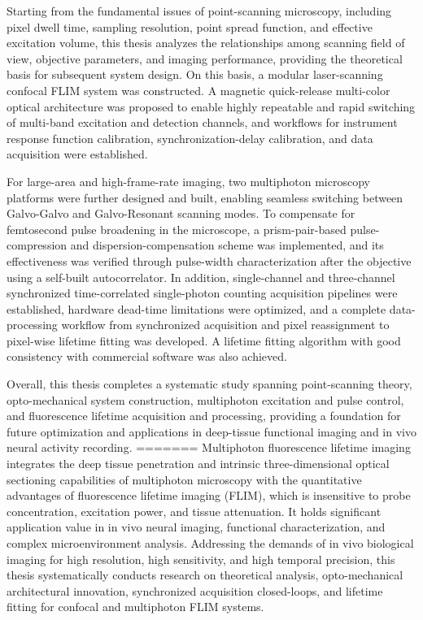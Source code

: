 Starting from the fundamental issues of point-scanning microscopy, including pixel dwell time, sampling resolution, point spread function, and effective excitation volume, this thesis analyzes the relationships among scanning field of view, objective parameters, and imaging performance, providing the theoretical basis for subsequent system design. On this basis, a modular laser-scanning confocal FLIM system was constructed. A magnetic quick-release multi-color optical architecture was proposed to enable highly repeatable and rapid switching of multi-band excitation and detection channels, and workflows for instrument response function calibration, synchronization-delay calibration, and data acquisition were established.

For large-area and high-frame-rate imaging, two multiphoton microscopy platforms were further designed and built, enabling seamless switching between Galvo-Galvo and Galvo-Resonant scanning modes. To compensate for femtosecond pulse broadening in the microscope, a prism-pair-based pulse-compression and dispersion-compensation scheme was implemented, and its effectiveness was verified through pulse-width characterization after the objective using a self-built autocorrelator. In addition, single-channel and three-channel synchronized time-correlated single-photon counting acquisition pipelines were established, hardware dead-time limitations were optimized, and a complete data-processing workflow from synchronized acquisition and pixel reassignment to pixel-wise lifetime fitting was developed. A lifetime fitting algorithm with good consistency with commercial software was also achieved.

Overall, this thesis completes a systematic study spanning point-scanning theory, opto-mechanical system construction, multiphoton excitation and pulse control, and fluorescence lifetime acquisition and processing, providing a foundation for future optimization and applications in deep-tissue functional imaging and in vivo neural activity recording.
=======
Multiphoton fluorescence lifetime imaging integrates the deep tissue penetration and intrinsic three-dimensional optical sectioning capabilities of multiphoton microscopy with the quantitative advantages of fluorescence lifetime imaging (FLIM), which is insensitive to probe concentration, excitation power, and tissue attenuation. It holds significant application value in in vivo neural imaging, functional characterization, and complex microenvironment analysis. Addressing the demands of in vivo biological imaging for high resolution, high sensitivity, and high temporal precision, this thesis systematically conducts research on theoretical analysis, opto-mechanical architectural innovation, synchronized acquisition closed-loops, and lifetime fitting for confocal and multiphoton FLIM systems.


